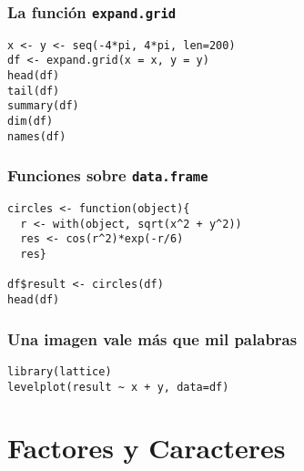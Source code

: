 \documentclass{beamer}
\begin{document}
\begin{frame}[fragile]
\frametitle{La función \texttt{expand.grid}}
\label{sec-3-2-4}



\lstset{language=R}
\begin{lstlisting}
x <- y <- seq(-4*pi, 4*pi, len=200)
df <- expand.grid(x = x, y = y)
head(df)
tail(df)
summary(df)
dim(df)
names(df)
\end{lstlisting}
\end{frame}
\begin{frame}[fragile]
\frametitle{Funciones sobre \texttt{data.frame}}
\label{sec-3-2-5}



\lstset{language=R}
\begin{lstlisting}
circles <- function(object){
  r <- with(object, sqrt(x^2 + y^2))
  res <- cos(r^2)*exp(-r/6)
  res}

df$result <- circles(df)
head(df)
\end{lstlisting}
\end{frame}
\begin{frame}[fragile]
\frametitle{Una imagen vale más que mil palabras}
\label{sec-3-2-6}


\lstset{language=R}
\begin{lstlisting}
library(lattice)
levelplot(result ~ x + y, data=df)
\end{lstlisting}
\end{frame}
\section{Factores y Caracteres}
\label{sec-4}
\end{document}
